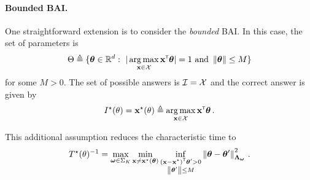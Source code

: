 
\paragraph{Bounded BAI.}\label{sec:lgc.formulation.examples.bounded}

One straightforward extension is to consider the \emph{bounded} BAI. In this case, the set of parameters is 
\[
    \Theta \eqdef \{\btheta \in \R^d:\ |\argmax_{\bx\in\cX} \bx\transpose\btheta|=1 \text{ and } \normm{\btheta}\leq M\}
\]
for some $M>0$. The set of possible answers is $\mathcal{I} = \mathcal{X}$ and the correct answer is given by 
\[
    I^\star(\theta) = {\bf x}^\star(\theta) \triangleq \operatorname*{arg\,max}_{{\bf x}\in\mathcal{X}} {\bf x}^\mathsf{\scriptscriptstyle T}{\boldsymbol \theta}\,.
\]

This additional assumption reduces the characteristic time to
\[
    T^{\star}(\theta)^{-1} = \max_{{\boldsymbol \omega}\in\Sigma_K} \min_{{\bf x}\neq {\bf x}^\star({\boldsymbol \theta})} \inf_{\substack{({\bf x}-{\bf x}^\star)^\mathsf{\scriptscriptstyle T}{\boldsymbol \theta}'>0\\ \left\lVert{\boldsymbol \theta}'\right\rVert\leq M}} \left\lVert{\boldsymbol \theta} -{\boldsymbol \theta}'\right\rVert_{{\boldsymbol \Lambda}_{{\boldsymbol \omega}}}^2 \,.
\]

